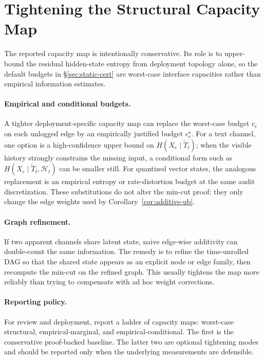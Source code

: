 \documentclass{article}
\begin{document}
  \section{Tightening the Structural Capacity Map}
  \label{app:static-tightening}

  The reported capacity map is intentionally conservative. Its role is to
  upper-bound the residual hidden-state entropy from deployment topology alone,
  so the default budgets in \S\ref{sec:static-cert} are worst-case interface
  capacities rather than empirical information estimates.

  \paragraph{Empirical and conditional budgets.}
  A tighter deployment-specific capacity map can replace the worst-case budget
  $c_e$ on each unlogged edge by an empirically justified budget $c_e^\star$.
  For a text channel, one option is a high-confidence upper bound on $H(X_e \mid
   \tilde T_t)$; when the visible history strongly constrains the missing input,
   a conditional form such as $H(X_e \mid \tilde T_t, \mathcal H_t)$ can be
  smaller still. For quantized vector states, the analogous replacement is an
  empirical entropy or rate-distortion budget at the same audit discretization.
  These substitutions do not alter the min-cut proof: they only change the edge
  weights used by Corollary~\ref{cor:additive-ub}.

  \paragraph{Graph refinement.}
  If two apparent channels share latent state, naive edge-wise additivity can
  double-count the same information. The remedy is to refine the time-unrolled
  DAG so that the shared state appears as an explicit node or edge family, then
  recompute the min-cut on the refined graph. This usually tightens the map more
  reliably than trying to compensate with ad hoc weight corrections.

  \paragraph{Reporting policy.}
  For review and deployment, report a ladder of capacity maps: worst-case
  structural, empirical-marginal, and empirical-conditional. The first is the
  conservative proof-backed baseline. The latter two are optional tightening
  modes and should be reported only when the underlying measurements are
  defensible.

  
\end{document}
